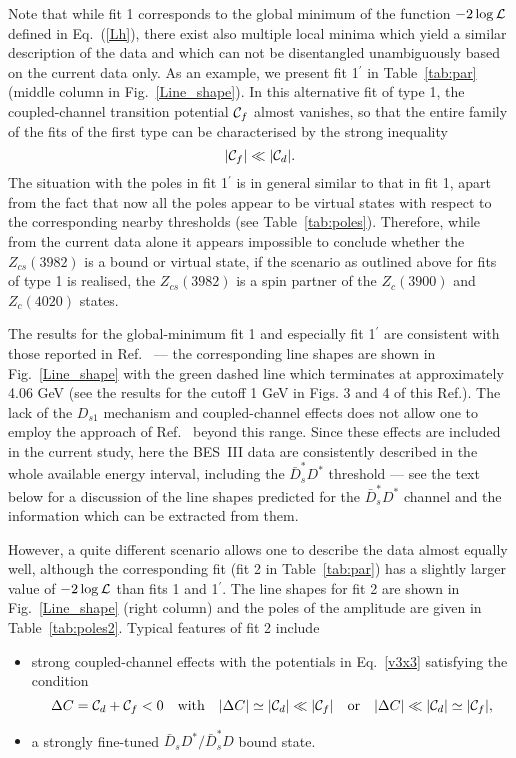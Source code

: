 \documentclass[preprint,12pt,3p]{elsarticle}
\newcommand{\be}{\begin{equation}}
\newcommand{\ee}{\end{equation}}
\begin{document}
Note that while fit 1 corresponds to the global
minimum of the function $-2\log{\cal L}$ defined in Eq.~(\ref{Lh}),
there exist also multiple local minima which yield a similar
description of the data and which can not be disentangled unambiguously
based on the current data only. As an example, we present fit 1$^\prime$ in Table~\ref{tab:par} (middle column in Fig.~\ref{Line_shape}). In this alternative fit of type 1, the coupled-channel transition potential ${\cal C}_f$ almost vanishes, so that the entire family of the fits of the first type can be characterised by the strong inequality
\be
|{\cal C}_f|\ll |{\cal C}_d|.
\label{fit1def}
\ee
The situation with the poles in fit 1$^\prime$ is in general similar to that
in fit 1, apart from the fact that now all the poles appear to be
virtual states with respect to the corresponding nearby thresholds
(see Table~\ref{tab:poles}). Therefore, while from the current data
alone it appears impossible to conclude whether the $Z_{cs}(3982)$ is
a bound or virtual state, if the scenario as outlined above for fits
of type 1 is realised, the $Z_{cs}(3982)$ is a spin partner of the $Z_c(3900)$ and $Z_c(4020)$ states. 

The results for the global-minimum fit 1 and especially fit 1$^\prime$ are consistent with those reported in Ref.~\cite{Yang:2020nrt} --- the corresponding line shapes are shown in Fig.~\ref{Line_shape} with the green dashed line which terminates at approximately 4.06 GeV (see the results for the cutoff 1 GeV in Figs. 3 and 4 of this Ref.). The lack of the $D_{s1}$ mechanism and coupled-channel effects does not allow one to employ the approach of Ref.~\cite{Yang:2020nrt} beyond this range. Since these effects are included in the current study, here the BES~III data are consistently described in the whole available energy interval, including the $\bar{D}^*_sD^*$ threshold --- see the text below for a discussion of the line shapes predicted for the $\bar{D}^*_sD^*$ channel and the information which can be extracted from them.

However, a quite different scenario allows one to describe the data almost equally well, although the corresponding fit (fit 2 in Table~\ref{tab:par}) has a slightly larger value of $-2\log{\cal L}$ than fits 1 and 1$^\prime$. The line shapes for fit 2 are shown in Fig.~\ref{Line_shape} (right column) and the poles of the amplitude are given in Table~\ref{tab:poles2}. Typical features of fit 2 include
\begin{itemize}
\item strong coupled-channel effects with the potentials in Eq.~\eqref{v3x3} satisfying the condition
\be
\Delta C = {\cal C}_d+{\cal C}_f< 0 \quad\mbox{with} \quad |\Delta C| \simeq |{\cal C}_d| \ll |{\cal C}_f| \quad\mbox{or} \quad |\Delta C|\ll |{\cal C}_d| \simeq |{\cal C}_f|,
\label{Eq:delta}
\ee
\item a strongly fine-tuned $\bar{D}_s D^*/\bar{D}_s^* D$ bound state. 
\end{itemize}
\end{document}
